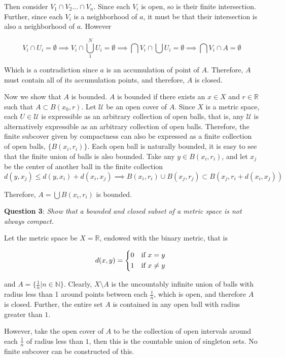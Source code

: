 \documentclass{article} %
\newcommand{\question}[2][]{
  \begin{flushleft}
    \textbf{Question #1}: \textit{#2}

\end{flushleft}}
\begin{document}
Then consider $V_1 \cap V_2 ... \cap V_n$. Since each $V_i$ is open,
so is their finite intersection. Further, since each $V_i$ is a
neighborhood of $a$, it must be that their intersection is also a
neighborhood of $a$. However

$$V_i \cap U_i = \emptyset \implies V_i \cap \bigcup_1^N U_i = \emptyset
\implies \bigcap V_i \cap \bigcup U_i = \emptyset \implies \bigcap
V_i \cap A = \emptyset$$

Which is a contradiction since $a$ is an accumulation of point of
$A$. Therefore, $A$ must contain all of its accumulation points, and
therefore, $A$ is closed.

Now we show that $A$ is bounded. $A$ is bounded if there exists an $x
\in X$ and $r \in\mathbb{R}$ such that $A \subset B(x_0, r)$. Let
$\mathcal{U}$ be an open cover of $A$. Since $X$ is a metric space,
each $U \in  \mathcal{U}$ is expressible as an arbitrary collection
of open balls, that is, any $\mathcal{U}$ is alternatively
expressible as an arbitrary collection of open balls. Therefore, the
finite subcover given by compactness can also be expressed as a
finite collection of open balls, $\{B(x_i, r_i)\}$. Each open ball is
naturally bounded, it is easy to see that the finite union of balls
is also bounded. Take any $y \in B(x_i, r_i)$, and let $x_j$ be the
center of another ball in the finite collection
\[
  d(y, x_j) \leq d(y,x_i) + d(x_i, x_j) \implies B(x_i, r_i) \cup
  B(x_j, r_j) \subset B(x_j, r_i + d(x_i,x_j))
\]

Therefore, $A = \bigcup B(x_i, r_i)$ is bounded.

\question[3]{Show that a bounded and closed subset of a metric space
is not always compact.}

Let the metric space be $X = \mathbb{R}$, endowed with the binary
metric, that is

\[
  d(x,y) =
  \begin{cases*}
    0 & if $x = y$ \\
    1 & if $x \neq y$
  \end{cases*}
\]

and $A = \{\frac{1}{n} | n \in
\mathbb{N}\}$. Clearly, $X \setminus A$ is the uncountably infinite
union of balls with radius less than 1 around points between each
$\frac{1}{n}$, which is open, and therefore $A$ is closed. Further,
the entire set $A$ is contained in any open ball with radius greater than $1$.

However, take the open cover of $A$ to be the collection of open
intervals around each $\frac{1}{n}$ of radius less than $1$, then
this is the countable union of singleton sets. No finite subcover can
be constructed of this.
\end{document}
